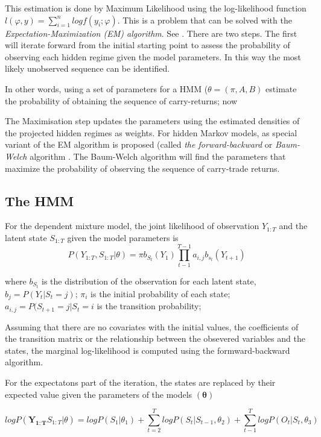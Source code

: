 \documentclass[12pt, a4paper, oneside]{article} %
\begin{document}
This estimation is done by Maximum Likelihood using the log-likelihood function $l(\varphi, y) = \sum_{i=1}^n log f(y_i; \varphi)$. This is a problem that can be solved with the \emph{Expectation-Maximization (EM) algorithm}.  See \citet{dempster1977maximum}. There are two steps. The first will iterate forward from the initial starting point to assess the probability of observing each hidden regime given the model parameters.  In this way the most likely unobserved sequence can be identified.  

In other words, using a set of parameters for a HMM ($\theta = (\pi, A, B)$ estimate the probability of obtaining the sequence of carry-returns; now 


The Maximisation step updates the parameters using the estimated densities of the projected hidden regimes as weights. For hidden Markov models, as special variant of the EM algorithm is proposed (called \emph{the forward-backward} or \emph{Baum-Welch} algorithm \citet{Baum1970}.   The Baum-Welch algorithm will find the parameters that maximize the probability of observing the sequence of carry-trade returns.  


\subsection{The HMM}
For the dependent mixture model, the joint likelihood of observation $Y_{1:T}$ and the latent state $S_{1:T}$ given the model parameters is 
\begin{equation}
P(Y_{1:T}, S_{1:T}|\theta) = \pi b_{S_t}(Y_1)\prod_{t-1}^{T-1} a_{i,j}b_{s_t}(Y_{t+1})
\end{equation}

where $b_{S_t}$ is the distribution of the observation for each latent state, $b_j = P(Y_t|S_t = j)$; $\pi_i$ is the initial probability of each state; $a_{i,j} = P(S_{t+1} = j| S_t = i$ is the transition probability;  

Assuming that there are no covariates with the initial values, the coefficients of the transition matrix or the relationship between the obsevered variables and the states, the marginal log-likelihood is computed using the formward-backward algorithm.

For the expectatons part of the iteration, the states are replaced by their expected value given the parameters of the models $(\mathbf{\theta})$

\begin{equation} 
log P(\mathbf{Y_{1:T}}S_{1:T}| \theta) = log P(S_1|\theta_1) + \sum_{t=2}^T log P(S_t|S_{t-1}, \theta_2) + \sum_{t-1}^T log P(O_t|S_t, \theta_3)
\end{equation}
\end{document}
